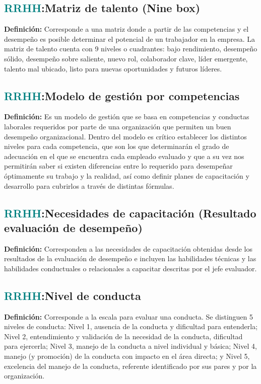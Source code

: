 \documentclass[12pt]{article}
\begin{document}
\subsection{\textcolor{teal}{RRHH}:{Matriz de talento (Nine box)}}
\textbf{Definición:} Corresponde a una matriz donde a partir de las competencias y el desempeño es posible determinar el potencial de un trabajador en la empresa. La matriz de talento cuenta con 9 niveles o cuadrantes: bajo rendimiento, desempeño sólido, desempeño sobre saliente, nuevo rol, colaborador clave, líder emergente, talento mal ubicado, listo para nuevas oportunidades y futuros líderes.
\subsection{\textcolor{teal}{RRHH}:{Modelo de gestión por competencias}}
\textbf{Definición:} Es un modelo de gestión que se basa en competencias y conductas laborales requeridos por parte de una organización que permiten un buen desempeño organizacional.
Dentro del modelo es crítico establecer los distintos niveles para cada competencia, que son los que determinarán el grado de adecuación en el que se encuentra cada empleado evaluado y que a su vez nos permitirán saber si existen diferencias entre lo requerido para desempeñar óptimamente su trabajo y la realidad, así como definir planes de capacitación y desarrollo para cubrirlos a través de distintas fórmulas.
\subsection{\textcolor{teal}{RRHH}:{Necesidades de capacitación (Resultado evaluación de desempeño)}}
\textbf{Definición:} Corresponden a las necesidades de capacitación obtenidas desde los resultados de la evaluación de desempeño e incluyen las habilidades técnicas y las habilidades conductuales o relacionales a capacitar descritas por el jefe evaluador.
\subsection{\textcolor{teal}{RRHH}:{Nivel de conducta}}
\textbf{Definición:} Corresponde a la escala para evaluar una conducta. Se distinguen 5 niveles de conducta: 
Nivel 1, ausencia de la conducta y dificultad para entenderla;
Nivel 2, entendimiento y validación de la necesidad de la conducta, dificultad para ejercerla; 
Nivel 3, manejo de la conducta a nivel individual y básica; 
Nivel 4, manejo (y promoción) de la conducta con impacto en el área directa; 
y Nivel 5, excelencia del manejo de la conducta, referente identificado por sus pares y por la organización.
\end{document}
